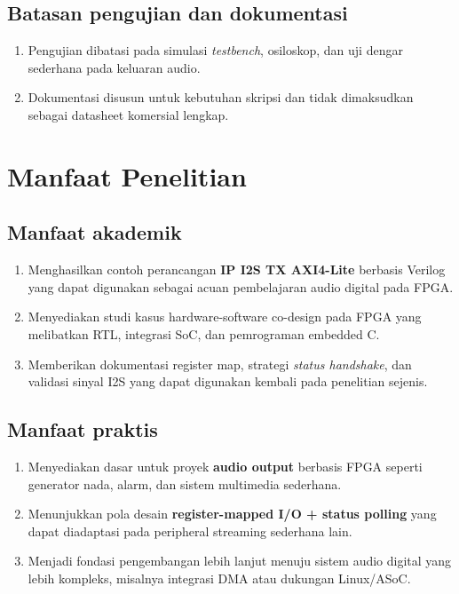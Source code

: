 \subsection{Batasan pengujian dan dokumentasi}
\begin{enumerate}
	\item Pengujian dibatasi pada simulasi \textit{testbench}, osiloskop, dan uji dengar sederhana pada keluaran audio.
	\item Dokumentasi disusun untuk kebutuhan skripsi dan tidak dimaksudkan sebagai datasheet komersial lengkap.
\end{enumerate}

\section{Manfaat Penelitian}

\subsection{Manfaat akademik}
\begin{enumerate}
	\item Menghasilkan contoh perancangan \textbf{IP I2S TX AXI4-Lite} berbasis Verilog yang dapat digunakan sebagai acuan pembelajaran audio digital pada FPGA.
	\item Menyediakan studi kasus hardware-software co-design pada FPGA yang melibatkan RTL, integrasi SoC, dan pemrograman embedded C.
	\item Memberikan dokumentasi register map, strategi \textit{status handshake}, dan validasi sinyal I2S yang dapat digunakan kembali pada penelitian sejenis.
\end{enumerate}

\subsection{Manfaat praktis}
\begin{enumerate}
	\item Menyediakan dasar untuk proyek \textbf{audio output} berbasis FPGA seperti generator nada, alarm, dan sistem multimedia sederhana.
	\item Menunjukkan pola desain \textbf{register-mapped I/O + status polling} yang dapat diadaptasi pada peripheral streaming sederhana lain.
	\item Menjadi fondasi pengembangan lebih lanjut menuju sistem audio digital yang lebih kompleks, misalnya integrasi DMA atau dukungan Linux/ASoC.
\end{enumerate}


